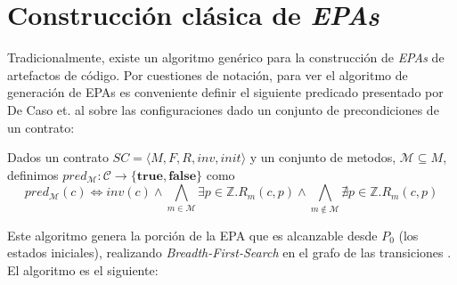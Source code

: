 
\section{Construcción clásica de \textit{EPAs}}
\label{sec:algoritmo-clasico}
Tradicionalmente, existe un algoritmo genérico para la construcción de \textit{EPAs} de artefactos de código.
Por cuestiones de notación, para ver el algoritmo de generación de EPAs es conveniente definir el siguiente predicado presentado por De Caso et. al \cite{de-caso-epa} sobre las configuraciones dado un conjunto de precondiciones de un contrato:

\begin{definition}
    Dados un contrato $SC = \langle M, F, R, inv, init \rangle$ y un conjunto de metodos, $\mathcal{M} \subseteq M$, definimos $pred_\mathcal{M} : \mathcal{C} \rightarrow \{\textbf{true}, \textbf{false}\}$ como
    \[pred_\mathcal{M}(c) \iff inv(c) \land \bigwedge\limits_{m \in \mathcal{M}} \exists p \in \mathds{Z} . R_m(c,p) \land \bigwedge\limits_{   m \notin \mathcal{M}} \nexists p \in \mathds{Z} . R_m(c,p)\]
\end{definition}
Este algoritmo genera la porción de la EPA que es alcanzable desde $P_0$ (los estados iniciales), realizando \textit{Breadth-First-Search} en el grafo de las transiciones \cite{de-caso-epa}.
El algoritmo es el siguiente:


